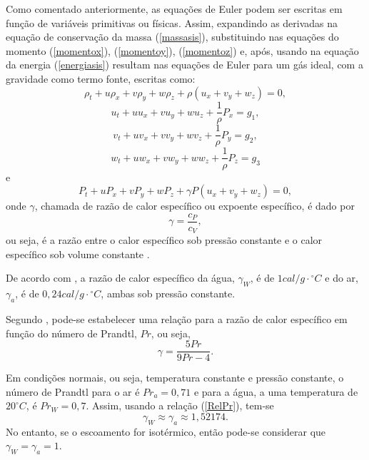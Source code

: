 Como comentado anteriormente, as equações de Euler podem ser escritas em função de variáveis primitivas ou físicas. Assim, expandindo as derivadas na equação de conservação da massa (\ref{massasis}), substituindo nas equações do momento (\ref{momentox}), (\ref{momentoy}), (\ref{momentoz})  e, após, usando na equação da energia (\ref{energiasis}) resultam nas equações de Euler para um gás ideal, com a gravidade como termo fonte, escritas como:
\begin{equation} \label{massasis2}
\rho_t + u \rho_x + v \rho_y + w \rho_z + \rho ( u_x + v_y + w_z ) = 0,
\end{equation}
\begin{equation} \label{momentox2}
u_t + uu_x + vu_y + wu_z + \frac{1}{ \rho} P_x = g_1,
\end{equation}
\begin{equation} \label{momentoy2}
v_t + uv_x + vv_y + wv_z + \frac{1}{ \rho} P_y = g_2,
\end{equation}
\begin{equation} \label{momentow2}
w_t + uw_x + vw_y + ww_z + \frac{1}{ \rho} P_z = g_3
\end{equation}
e
\begin{equation} \label{energiasis2}
P_t + uP_x + vP_y + wP_z + \gamma P( u_x + v_y + w_z ) = 0,
\end{equation}
onde $ \gamma$, chamada de razão de calor específico ou expoente específico, é dado por
\begin{equation}
\gamma = \frac{ c_P}{c_V},
\end{equation}
ou seja, é a razão entre o calor específico sob pressão constante e o calor específico sob volume constante \cite{Leveque2004}.

De acordo com , a razão de calor específico da água, $ \gamma_W$, é de $ 1 cal/{g \cdot{} ^{ \circ}} C $ e do ar, $ \gamma_a$, é de $ 0,24 cal/{g \cdot{} ^{ \circ}} C $, ambas sob pressão constante.

Segundo , pode-se estabelecer uma relação para a razão de calor específico em função do número de Prandtl, $Pr$, ou seja, 
\begin{equation} \label{RelPr}
\gamma = \frac{5Pr}{9Pr - 4}.
\end{equation}

Em condições normais, ou seja, temperatura constante e pressão constante, o número de Prandtl para o ar é $Pr_{a} = 0,71$ e para a água, a uma temperatura de $ 20^{ \circ}C$, é  $Pr_{W} = 0,7$. Assim, usando a relação (\ref{RelPr}), tem-se
\begin{equation} \label{rel}
\gamma_W \approx \gamma_a \approx 1,52174.
\end{equation}
No entanto, se o escoamento for isotérmico, então pode-se considerar que  $\gamma_W = \gamma_a = 1$.

